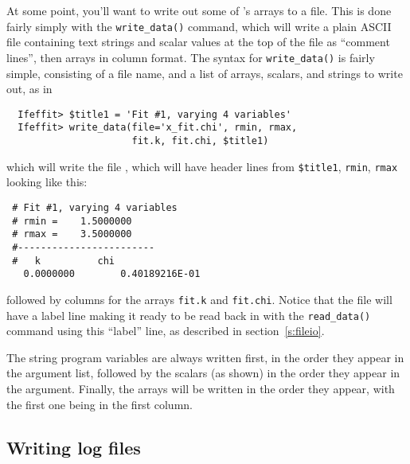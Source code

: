 \documentclass[11pt]{article}
\begin{document}
At some point, you'll want to write out some of {\ifeffit}'s arrays to a
file.  This is done fairly simply with the {\tt{write\_data()}} command,
which will write a plain ASCII file containing text strings and scalar
values at the top of the file as ``comment lines'', then arrays in column
format.  The syntax for {\tt{write\_data()}} is fairly simple, consisting
of a file name, and a list of arrays, scalars, and strings to write out, as
in
{\small\begin{verbatim}
  Ifeffit> $title1 = 'Fit #1, varying 4 variables'
  Ifeffit> write_data(file='x_fit.chi', rmin, rmax,
                      fit.k, fit.chi, $title1)
\end{verbatim}
}\noindent
which will write the file {}, which will have header lines
from {\tt{\$title1}}, {\tt{rmin}}, {\tt{rmax}} looking like this:
{\small{
 \begin{Sbox}\begin{minipage}{5.00truein}
\begin{Verbatim}
 # Fit #1, varying 4 variables
 # rmin =    1.5000000
 # rmax =    3.5000000
 #------------------------
 #   k          chi
   0.0000000        0.40189216E-01
\end{Verbatim}
 \end{minipage}
 \end{Sbox}\setlength{\fboxsep}{2mm}{%
 \begin{flushright}\shadowbox{\TheSbox}\end{flushright}}
}}\noindent
followed by columns for the
arrays {\tt{fit.k}} and {\tt{fit.chi}}.  Notice that the file will have a
label line making it ready to be read back in with the {\tt{read\_data()}}
command using this ``label'' line, as described in  section~\ref{s:fileio}.

The string program variables are always written first, in the order they
appear in the argument list, followed by the scalars (as shown) in the
order they appear in the argument.  Finally, the arrays will be written in
the order they appear, with the first one being in the first column.

\subsection{Writing log files}
\label{s:log-save:log}
\end{document}
